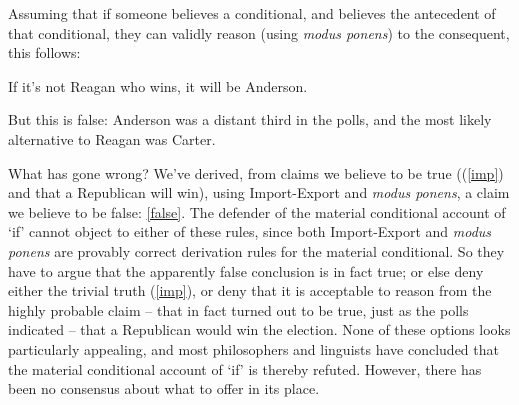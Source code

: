 Assuming that if someone believes a conditional, and believes the antecedent of that conditional, they can validly reason (using \emph{modus ponens}) to the consequent, this follows: \begin{exe}
	\ex If it's not Reagan who wins, it will be Anderson.\label{false}
\end{exe}
But this is false: Anderson was a distant third in the polls, and the most likely alternative to Reagan was Carter. 


What has gone wrong? We've derived, from claims we believe to be true ((\ref{imp}) and that a Republican will win), using Import-Export and \emph{modus ponens}, a claim we believe to be false: \ref{false}. The defender of the material conditional account of `if' cannot object to either of these rules, since both Import-Export and \emph{modus ponens} are provably correct derivation rules for the material conditional. So they have to argue that the apparently false conclusion is in fact true; or else deny either the trivial truth (\ref{imp}), or deny that it is acceptable to reason from the highly probable claim – that in fact turned out to be true, just as the polls indicated – that a Republican would win the election. None of these options looks particularly appealing, and most philosophers and linguists have concluded that the material conditional account of `if' is thereby refuted. However, there has been no consensus about what to offer in its place. 




